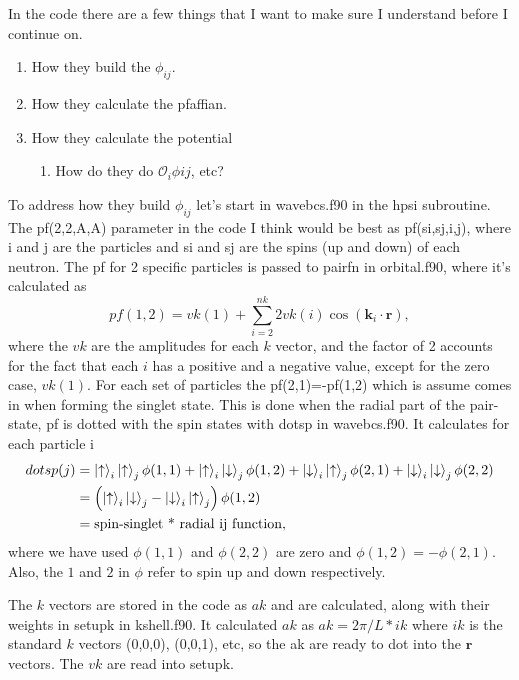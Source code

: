 In the code there are a few things that I want to make sure I understand before I continue on.
\begin{enumerate}
   \item How they build the $\phi_{ij}$.
   \item How they calculate the pfaffian.
   \item How they calculate the potential
   \begin{enumerate}
      \item How do they do $\mathcal{O}_i\phi{ij}$, etc?
   \end{enumerate}
\end{enumerate}
To address how they build $\phi_{ij}$ let's start in wavebcs.f90 in the hpsi subroutine. The pf(2,2,A,A) parameter in the code I think would be best as pf(si,sj,i,j), where i and j are the particles and si and sj are the spins (up and down) of each neutron. The pf for 2 specific particles is passed to pairfn in orbital.f90, where it's calculated as
\begin{equation}
   pf(1,2)=vk(1)+\sum\limits_{i=2}^{nk} 2vk(i)\cos(\mathbf{k}_i\cdot\mathbf{r}),
\end{equation}
where the $vk$ are the amplitudes for each $k$ vector, and the factor of 2 accounts for the fact that each $i$ has a positive and a negative value, except for the zero case, $vk(1)$. For each set of particles the pf(2,1)=-pf(1,2) which is assume comes in when forming the singlet state. This is done when the radial part of the pair-state, pf is dotted with the spin states with dotsp in wavebcs.f90. It calculates for each particle i
\begin{align}
   dotsp(j) &= \left| \uparrow \right>_i\left| \uparrow \right>_j\phi(1,1)+\left| \uparrow \right>_i\left| \downarrow \right>_j\phi(1,2)+\left| \downarrow \right>_i\left| \uparrow \right>_j\phi(2,1)+\left| \downarrow \right>_i\left| \downarrow \right>_j\phi(2,2) \\
   &= \left(\left| \uparrow \right>_i\left| \downarrow \right>_j-\left| \downarrow \right>_i\left| \uparrow \right>_j\right)\phi(1,2) \\
   &= \text{spin-singlet * radial ij function},
\end{align}
where we have used $\phi(1,1)$ and $\phi(2,2)$ are zero and $\phi(1,2)=-\phi(2,1)$. Also, the $1$ and $2$ in $\phi$ refer to spin up and down respectively.

The $k$ vectors are stored in the code as $ak$ and are calculated, along with their weights in setupk in kshell.f90. It calculated $ak$ as $ak=2\pi/L*ik$ where $ik$ is the standard $k$ vectors (0,0,0), (0,0,1), etc, so the ak are ready to dot into the $\mathbf{r}$ vectors. The $vk$ are read into setupk.

